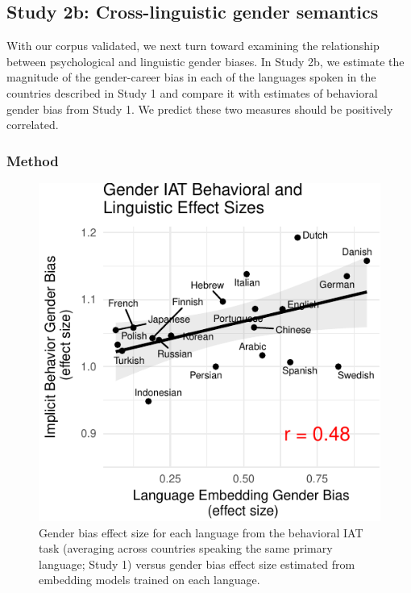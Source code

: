\documentclass[10pt, letterpaper]{article}
\newenvironment{CodeChunk}{}{}
\begin{document}
\subsection{Study 2b: Cross-linguistic gender
semantics}\label{study-2b-cross-linguistic-gender-semantics}

With our corpus validated, we next turn toward examining the
relationship between psychological and linguistic gender biases. In
Study 2b, we estimate the magnitude of the gender-career bias in each of
the languages spoken in the countries described in Study 1 and compare
it with estimates of behavioral gender bias from Study 1. We predict
these two measures should be positively correlated.

\subsubsection{Method}\label{method-2}

\begin{CodeChunk}
\begin{figure}[t]

{\centering \includegraphics{figs/behavior_vs_language_plot-1} 

}

\caption[Gender bias effect size for each language from the behavioral IAT task (averaging across countries speaking the same primary language]{Gender bias effect size for each language from the behavioral IAT task (averaging across countries speaking the same primary language; Study 1) versus gender bias effect size estimated from embedding models trained on each language.}\label{fig:behavior_vs_language_plot}
\end{figure}
\end{CodeChunk}
\end{document}
